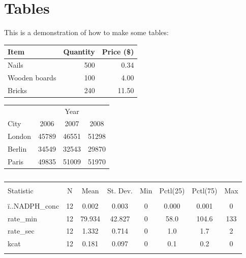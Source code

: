 \documentclass[a4paper, 12pt]{article}
\begin{document}
\section{Tables}

This is a demonstration of how to make some tables: \\

\begin{tabular}{l|r|r}
Item & Quantity & Price (\$) \\
\hline
Nails & 500 & 0.34 \\
Wooden boards & 100 & 4.00 \\
Bricks & 240 & 11.50 \\
\end{tabular}

\begin{tabular}{|l|c c c|}
\hline
{} & {} & Year & {} \\
\cline{2-4}
City & 2006 & 2007 & 2008 \\
\hline
London & 45789 & 46551 & 51298 \\
Berlin & 34549 & 32543 & 29870 \\
Paris & 49835 & 51009 & 51970 \\
\hline
\end{tabular}

\begin{table}[!htbp] \centering 
  \caption{} 
  \label{} 
\begin{tabular}{@{\extracolsep{5pt}}lccccccc} 
\\[-1.8ex]\hline 
\hline \\[-1.8ex] 
Statistic & \multicolumn{1}{c}{N} & \multicolumn{1}{c}{Mean} & \multicolumn{1}{c}{St. Dev.} & \multicolumn{1}{c}{Min} & \multicolumn{1}{c}{Pctl(25)} & \multicolumn{1}{c}{Pctl(75)} & \multicolumn{1}{c}{Max} \\ 
\hline \\[-1.8ex] 
ï..NADPH\_conc & 12 & 0.002 & 0.003 & 0 & 0.000 & 0.001 & 0 \\ 
rate\_min & 12 & 79.934 & 42.827 & 0 & 58.0 & 104.6 & 133 \\ 
rate\_sec & 12 & 1.332 & 0.714 & 0 & 1.0 & 1.7 & 2 \\ 
kcat & 12 & 0.181 & 0.097 & 0 & 0.1 & 0.2 & 0 \\ 
\hline \\[-1.8ex] 
\end{tabular} 
\end{table}
\end{document}
